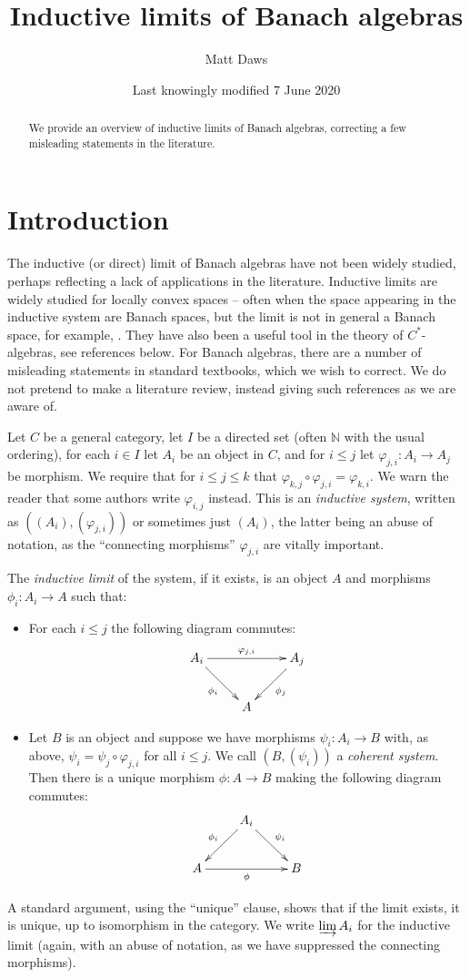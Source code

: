 \documentclass[a4paper,11pt]{article}
\title{Inductive limits of Banach algebras}
\author{Matt Daws}
\date{Last knowingly modified 7 June 2020}
\newcommand{\indlim}{\varinjlim}
\theoremstyle{definition}
\begin{document}
\maketitle

\begin{abstract}
We provide an overview of inductive limits of Banach algebras, correcting a few misleading
statements in the literature.
\end{abstract}

\tableofcontents

\section{Introduction}

The inductive (or direct) limit of Banach algebras have not been widely studied, perhaps reflecting
a lack of applications in the literature.  Inductive limits are widely studied for locally convex
spaces -- often when the space appearing in the inductive system are Banach spaces, but the limit is
not in general a Banach space, for example, \cite[Chapter~IV, Section~5]{conway}.  They have also
been a useful tool in the theory of $C^*$-algebras, see references below.  For Banach algebras,
there are a number of misleading statements in standard textbooks, which we wish to correct.  We do
not pretend to make a literature review, instead giving such references as we are aware of.

Let $C$ be a general category, let $I$ be a directed set (often $\mathbb N$ with the usual
ordering), for each $i\in I$ let $A_i$ be an object in $C$, and for $i\leq j$ let $\varphi_{j,i}:
A_i\rightarrow A_j$ be morphism.  We require that for $i\leq j\leq k$ that $\varphi_{k,j} \circ
\varphi_{j,i} = \varphi_{k,i}$.  We warn the reader that some authors write $\varphi_{i,j}$
instead.  This is an \emph{inductive system}, written as $((A_i), (\varphi_{j,i}))$ or sometimes
just $(A_i)$, the latter being an abuse of notation, as the ``connecting morphisms'' $\varphi_{j,i}$
are vitally important.

The \emph{inductive limit} of the system, if it exists, is an object $A$ and morphisms $\phi_i:
A_i\rightarrow A$ such that:
\begin{itemize}
\item For each $i\leq j$ the following diagram commutes:
\[ \xymatrix{ A_i \ar[rr]^-{\varphi_{j,i}} \ar[rd]_{\phi_i} && A_j \ar[ld]^{\phi_j} \\
& A
} \]
\item Let $B$ is an object and suppose we have morphisms $\psi_i:A_i\rightarrow B$ with, as above,
$\psi_i = \psi_j \circ \varphi_{j,i}$ for all $i\leq j$.  We call $(B,(\psi_i))$ a \emph{coherent
system}.  Then there is a unique morphism
$\phi:A\rightarrow B$ making the following diagram commutes:
\[ \xymatrix{ & A_i \ar[ld]_{\phi_i} \ar[rd]^{\psi_i} \\
A \ar[rr]_{\phi} && B
} \]
\end{itemize}
A standard argument, using the ``unique'' clause, shows that if the limit exists, it is unique,
up to isomorphism in the category.  We write $\indlim A_i$ for the inductive limit (again, with an
abuse of notation, as we have suppressed the connecting morphisms).
\end{document}
